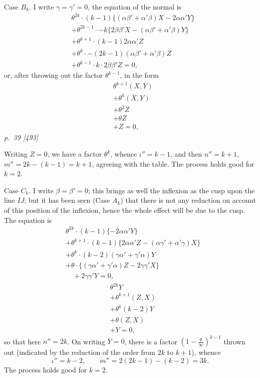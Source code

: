 ﻿\documentclass[11pt,a4paper]{article}
\theoremstyle{plain}
\theoremstyle{definition}
\begin{document}
Case \(B_k\). I write \(\gamma=\gamma'=0\), the equation of the normal is
\[
\begin{aligned}
&\theta^{2k}\cdot(k-1)\{(\alpha\beta'+\alpha'\beta)X-2\alpha\alpha'Y\}\\
&+\theta^{2k-1}\cdot -k\{2\beta\beta'X-(\alpha\beta'+\alpha'\beta)Y\}\\
&+\theta^{k+1}\cdot(k-1)2\alpha\alpha'Z\\
&+\theta^k\cdot-(2k-1)(\alpha\beta'+\alpha'\beta)Z\\
&+\theta^{k-1}\cdot k\cdot 2\beta\beta'Z=0,
\end{aligned}
\]
or, after throwing out the factor \(\theta^{k-1}\), in the form
\[
\begin{aligned}
&\theta^{k+1}(X,Y)\\
&+\theta^k(X,Y)\\
&+\theta^2Z\\
&+\theta Z\\
&+Z=0,
\end{aligned}
\]
\clearpage
\textit{p.~39 [493]}

Writing \(Z=0\), we have a factor \(\theta^k\), whence
\(\iota''=k-1\), and then \(n''=k+1\),
\(m''=2k-(k-1)=k+1\), agreeing with the table. The process holds good for
\(k=2\).

Case \(C_k\). I write \(\beta=\beta'=0\); this brings as well the inflexion
as the cusp upon the line \(IJ\); but it has been seen (Case \(A_k\)) that
there is not any reduction on account of this position of the inflexion,
hence the whole effect will be due to the cusp. The equation is
\[
\begin{aligned}
&\theta^{2k}\cdot(k-1)\{-2\alpha\alpha'Y\}\\
&+\theta^{k+1}\cdot(k-1)\{2\alpha\alpha'Z-(\alpha\gamma'+\alpha'\gamma)X\}\\
&+\theta^k\cdot(k-2)(\gamma\alpha'+\gamma'\alpha)Y\\
&+\theta\cdot\{(\gamma\alpha'+\gamma'\alpha)Z-2\gamma\gamma'X\}\\
&\quad+2\gamma\gamma'Y=0,
\end{aligned}
\]
\[
\begin{aligned}
&\theta^{2k}Y\\
&+\theta^{k+1}(Z,X)\\
&+\theta^k(k-2)Y\\
&+\theta(Z,X)\\
&+Y=0,
\end{aligned}
\]
so that here \(n''=2k\). On writing \(Y=0\), there is a factor
\((1-\frac{\theta}{\infty})^{k-1}\) thrown out (indicated by the reduction
of the order from \(2k\) to \(k+1\)), whence
\[
\iota''=k-2,\qquad m''=2(2k-1)-(k-2)=3k.
\]
The process holds good for \(k=2\).
\end{document}
